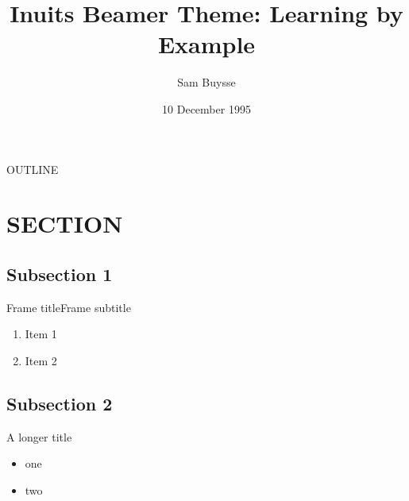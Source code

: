 \documentclass[aspectratio=169]{beamer}
\title{Inuits Beamer Theme: Learning by Example}
\date{10 December 1995}
\author{Sam Buysse}
\begin{document}
\begin{frame}
    \titlepage
\end{frame}

\begin{frame}[plain]{OUTLINE}
    \addtocounter{framenumber}{-1}
    \tableofcontents
\end{frame}

\section{SECTION}
\begin{frame}[plain]
    \sectionpage
\end{frame}

\subsection{Subsection 1}
\begin{frame}{Frame title}{Frame subtitle}
\begin{enumerate}
\item Item 1
\item Item 2
\end{enumerate}
\end{frame}

\subsection{Subsection 2}
\begin{frame}{A longer title}
\begin{itemize}
\item one
\item two
\end{itemize}
\end{frame}
\end{document}
